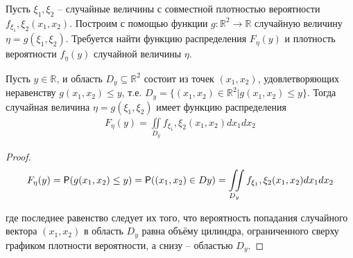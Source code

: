 \begin{zam}
Пусть $\xi_1 , \xi_2$ -- случайные величины с совместной плотностью вероятности $f_{\xi_1} ,\xi_2 (x_1 , x_2 )$. Построим с помощью функции $g : \mathbb{R}^2 \to \mathbb{R}$ случайную величину $\eta = g(\xi_1 , \xi_2 )$. Требуется найти функцию распределения $F_\eta (y)$ и плотность вероятности $f_\eta (y)$ случайной величины $\eta$.
\end{zam}

\begin{lemma}
Пусть $y \in \mathbb{R}$, и область $D_y \subseteq \mathbb{R}^2$ состоит из точек $(x_1 , x_2 )$, удовлетворяющих неравенству $g(x_1 , x_2 ) \leq y$, т.е. $D_y = \{(x_1 , x_2 ) \in \mathbb{R}^2 | g(x_1 , x_2 ) \leq y\}$. Тогда случайная величина $\eta = g(\xi_1 , \xi_2 )$ имеет функцию распределения
\begin{gather*}
	F_\eta (y) = \iint\limits_{D_y}f_{\xi_1} ,\xi_2 (x_1 , x_2 ) dx_1 dx_2
\end{gather*}
\end{lemma}

\begin{proof}
\begin{gather*}
	F_\eta (y) = \P ( g(x_1 , x_2 ) \leq y ) = \P( (x_1 , x_2 ) \in Dy )= \iint\limits_{D_y}f_{\xi_1} ,\xi_2 (x_1 , x_2 ) dx_1 dx_2
\end{gather*}

где последнее равенство следует их того, что вероятность попадания случайного вектора $(x_1 , x_2 )$ в область $D_y$ равна объёму цилиндра, ограниченного сверху графиком плотности вероятности, а снизу -- областью $D_y$.
\end{proof}

